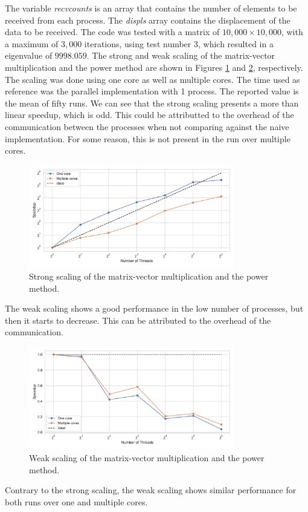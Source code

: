 \documentclass[unicode,11pt,a4paper,oneside,numbers=endperiod,openany]{scrartcl}
\begin{document}
The variable \textit{recvcounts} is an array that contains the number of
elements to be received from each process. The \textit{displs} array contains
the displacement of the data to be received. The code was tested with a matrix
of $10,000\times 10,000$, with a maximum of $3,000$ iterations, using test
number $3$, which resulted in a eigenvalue of $9998.059$. The strong and weak
scaling of the matrix-vector multiplication and the power method are shown in
Figures \ref{fig:strong_scaling} and \ref{fig:weak_scaling}, respectively. 
The scaling was done using one core as well as multiple cores.
The
time used as reference was the parallel implementation with 1 process. The
reported value is the mean of fifty runs. We can see that the strong scaling
presents a more than linear speedup, which is odd. This could be attributted to
the overhead of the communication between the processes when not comparing against
the naive implementation. For some reason, this is not present in the run over
multiple cores. 

\begin{figure}[h!]
    \centering
    \includegraphics[width=0.8\textwidth]{../powermethod/strong_scaling_plot.pdf}
    \caption{Strong scaling of the matrix-vector multiplication and the power method.}
    \label{fig:strong_scaling}
\end{figure}
The weak scaling shows a good performance in the low number of processes, but
then it starts to decrease. This can be attributed to the overhead of the
communication. 
\begin{figure}[h!]
    \centering
    \includegraphics[width=0.8\textwidth]{../powermethod/weak_scaling_plot.pdf}
    \caption{Weak scaling of the matrix-vector multiplication and the power method.}
    \label{fig:weak_scaling}
\end{figure}
Contrary to the strong scaling, the weak scaling shows similar performance for
both runs over one and multiple cores.
\end{document}
